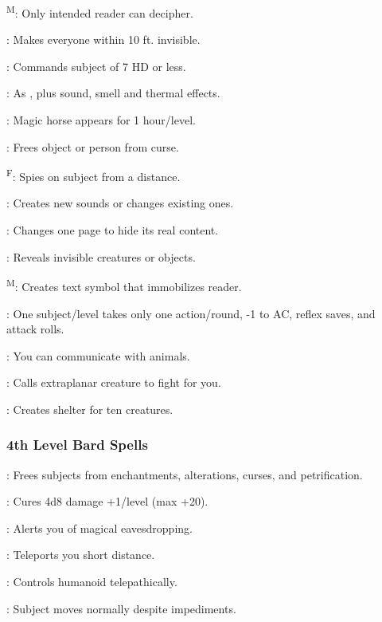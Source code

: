 \textsuperscript{M}: Only intended reader can decipher.

: Makes everyone within 10 ft. invisible.

: Commands subject of 7 HD or less.

: As , plus sound, smell and thermal effects.

: Magic horse appears for 1 hour/level.

: Frees object or person from curse.

\textsuperscript{F}: Spies on subject from a distance.

: Creates new sounds or changes existing ones.

: Changes one page to hide its real content.

: Reveals invisible creatures or objects.

\textsuperscript{M}: Creates text symbol that immobilizes reader.

: One subject/level takes only one action/round, -1 to AC, reflex saves, and attack rolls.

: You can communicate with animals.

: Calls extraplanar creature to fight for you.

: Creates shelter for ten creatures.

\subsubsection{4th Level Bard Spells}

: Frees subjects from enchantments, alterations, curses, and petrification.

: Cures 4d8 damage +1/level (max +20).

: Alerts you of magical eavesdropping.

: Teleports you short distance.

: Controls humanoid telepathically.

: Subject moves normally despite impediments.

